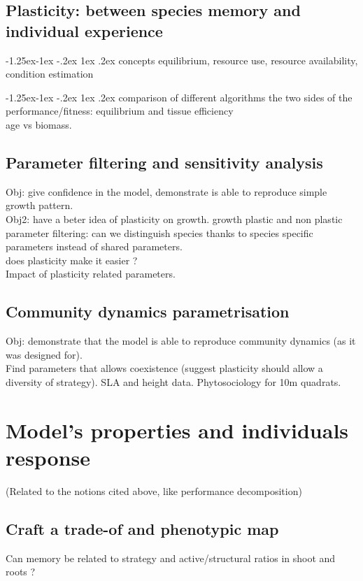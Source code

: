 \documentclass[english,10pt]{article}
\makeatletter
\renewcommand\paragraph{
\@startsection{paragraph}{4}{\z@}
{-1.25ex\@plus -1ex \@minus -.2ex}
{1ex \@plus .2ex}
{\normalfont\normalsize\bfseries}}
\makeatother
\begin{document}
\subsection{Plasticity: between species memory and individual experience}
\paragraph{concepts} equilibrium, resource use, resource availability, condition estimation
\paragraph{comparison of different algorithms}
the two sides of the performance/fitness: equilibrium and tissue efficiency\\
age vs biomass.

\subsection{Parameter filtering and sensitivity analysis}
Obj: give confidence in the model, demonstrate is able to reproduce simple growth pattern.\\
Obj2: have a beter idea of plasticity on growth.
growth plastic and non plastic parameter filtering: can we distinguish species thanks to species specific parameters instead of shared parameters.\\
does plasticity make it easier ?\\
Impact of plasticity related parameters.

\subsection{Community dynamics parametrisation}
Obj: demonstrate that the model is able to reproduce community dynamics (as it was designed for).\\
Find parameters that allows coexistence (suggest plasticity should allow a diversity of strategy). SLA and height data. Phytosociology for 10m quadrats.

\section{Model's properties and individuals response}
(Related to the notions cited above, like performance decomposition)

\subsection{Craft a trade-of and phenotypic map}
Can memory be related to strategy and active/structural ratios in shoot and roots ?
\end{document}

